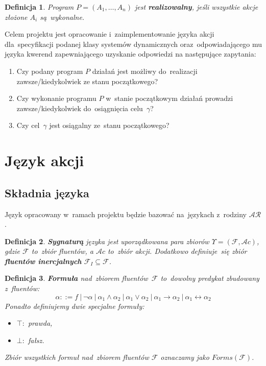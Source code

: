 \documentclass[11pt,a4paper]{article}
\newtheorem{defn}{Definicja}
\begin{document}
\begin{defn}
    Program $P = (A_1, \dots, A_n)$ jest \textbf{realizowalny}, jeśli wszystkie akcje złożone $A_i$ są~wykonalne.
\end{defn}

Celem projektu jest opracowanie i~zaimplementowanie języka akcji dla~specyfikacji podanej klasy systemów dynamicznych oraz~odpowiadającego mu języka kwerend zapewniającego uzyskanie odpowiedzi na następujące zapytania:

\begin{enumerate}
    \item Czy podany program $P$ działań jest możliwy do~realizacji zawsze/kiedykolwiek ze stanu początkowego?
    \item Czy wykonanie programu $P$ w~stanie początkowym działań prowadzi zawsze/kiedykolwiek do~osiągnięcia celu~$\gamma$?
    \item Czy cel~$\gamma$ jest osiągalny ze~stanu początkowego?
\end{enumerate}


\section{Język akcji}

\subsection{Składnia języka}

Język opracowany w~ramach projektu będzie bazować na~językach z~rodziny $\mathcal{AR}$.

\begin{defn}
    \textbf{Sygnaturą} języka jest uporządkowana para zbiorów $\Upsilon = (\mathcal{F}, \mathcal{A}c)$, gdzie $\mathcal{F}$ to~zbiór fluentów, a $ \mathcal{A}c$ to~zbiór akcji. Dodatkowo definiuje~się zbiór \textbf{fluentów inercjalnych} $\mathcal{F}_I \subseteq \mathcal{F}$.
\end{defn}

\begin{defn}
    \textbf{Formuła} nad~zbiorem fluentów~$\mathcal{F}$ to~dowolny predykat zbudowany z~fluentów: 
    $$ \alpha ::= f\ |\ \neg\alpha\ |\ \alpha_1 \land \alpha_2\ |\ \alpha_1 \lor \alpha_2\ |\ \alpha_1 \rightarrow \alpha_2\ |\ \alpha_1 \leftrightarrow \alpha_2 $$
    Ponadto definiujemy dwie specjalne formuły:
    
    \begin{itemize}
    \item $\top\colon$ prawda,
    
    \item $\bot\colon$ fałsz.
    \end{itemize}
    
    Zbiór wszystkich formuł nad~zbiorem fluentów $\mathcal{F}$ oznaczamy jako $Forms(\mathcal{F})$.
\end{defn}
\end{document}

